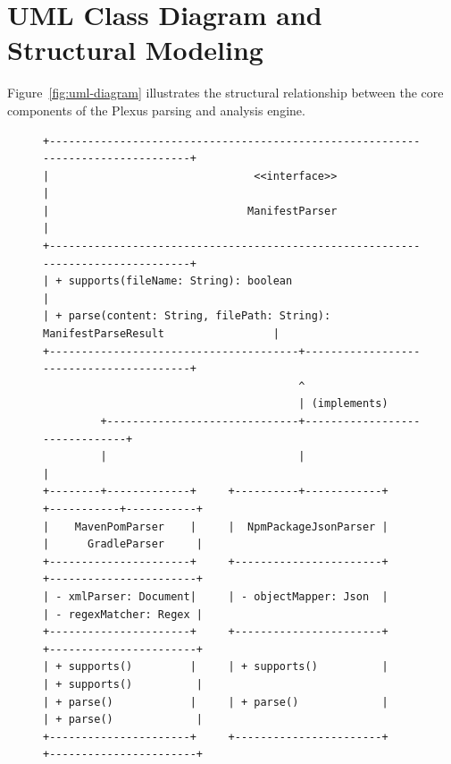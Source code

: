 \documentclass[11pt,a4paper,openany]{report}
\begin{document}
\section{UML Class Diagram and Structural Modeling}
Figure~\ref{fig:uml-diagram} illustrates the structural relationship between the core components of the Plexus parsing and analysis engine.

\begin{figure}[htbp]
\centering
\begin{lstlisting}[style=asciistyle, rulecolor=\color{secondary}]
+---------------------------------------------------------------------------------+
|                                <<interface>>                                    |
|                               ManifestParser                                    |
+---------------------------------------------------------------------------------+
| + supports(fileName: String): boolean                                           |
| + parse(content: String, filePath: String): ManifestParseResult                 |
+---------------------------------------+-----------------------------------------+
                                        ^
                                        | (implements)
         +------------------------------+-------------------------------+
         |                              |                               |
+--------+-------------+     +----------+------------+      +-----------+-----------+
|    MavenPomParser    |     |  NpmPackageJsonParser |      |      GradleParser     |
+----------------------+     +-----------------------+      +-----------------------+
| - xmlParser: Document|     | - objectMapper: Json  |      | - regexMatcher: Regex |
+----------------------+     +-----------------------+      +-----------------------+
| + supports()         |     | + supports()          |      | + supports()          |
| + parse()            |     | + parse()             |      | + parse()             |
+----------------------+     +-----------------------+      +-----------------------+


\end{lstlisting}
\end{figure}
\end{document}
